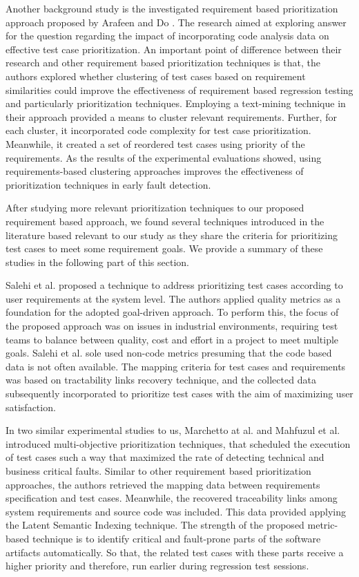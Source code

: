 \documentclass{sig-alternate}
\begin{document}
Another background study is the investigated requirement based prioritization approach proposed by Arafeen and Do \cite{junaid:clustering}. The research aimed at exploring answer for the question regarding the impact of incorporating code analysis data on effective test case prioritization. An important point of difference between their research and other requirement based prioritization techniques is that, the authors explored whether clustering of test cases based on requirement similarities could improve the effectiveness of requirement based regression testing and particularly prioritization techniques. Employing a text-mining technique in their approach provided a means to cluster relevant requirements. Further, for each cluster, it incorporated code complexity for test case prioritization. Meanwhile, it created a set of reordered test cases using priority of the requirements. As the results of the experimental evaluations showed, using requirements-based clustering approaches improves the effectiveness of prioritization techniques in early fault detection.

After studying more relevant prioritization techniques to our proposed requirement based approach, we found several techniques introduced in the literature based relevant to our study as they share the criteria for prioritizing test cases to meet some requirement goals. We provide a summary of these studies in the following part of this section.

Salehi et al. proposed a technique \cite{saleh:goaldriven} to address prioritizing test cases according to user requirements at the system level. The authors applied quality metrics as a foundation for the adopted goal-driven approach. To perform this, the focus of the proposed approach was on issues in industrial environments, requiring test teams to balance between quality, cost and effort in a project to meet multiple goals. Salehi et al. sole used non-code metrics presuming that the code based data is not often available. The mapping criteria for test cases and requirements was based on tractability links recovery technique, and the collected data subsequently incorporated to prioritize test cases with the aim of maximizing user satisfaction.

In two similar experimental studies to us, Marchetto at al. \cite{marchetto:multi} and Mahfuzul et al. \cite{mahfuzul:multiobjective} introduced multi-objective prioritization techniques,  that scheduled the execution of test cases such a way that maximized the rate of detecting technical and business critical faults. Similar to other requirement based prioritization approaches, the authors retrieved the mapping data between requirements specification and test cases. Meanwhile, the recovered traceability links among system requirements and source code was included. This data provided applying the Latent Semantic Indexing technique. The strength of the proposed metric-based technique is to identify critical and fault-prone parts of the software artifacts automatically. So that, the related test cases with these parts receive a higher priority and therefore, run earlier during regression test sessions.
\end{document}
